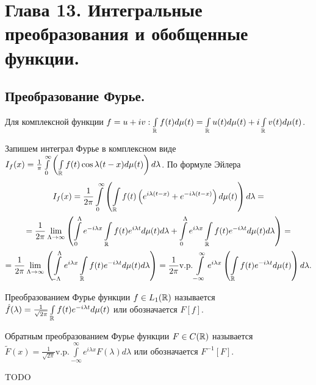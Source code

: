 \section{Глава 13. Интегральные преобразования и обобщенные функции.}
\subsection{Преобразование Фурье.}
Для комплексной функции $f=u+iv: \int\limits_{\mathbb{R}} f(t)d\mu(t)=\int\limits_{\mathbb{R}} u(t)d\mu(t)+i\int\limits_{\mathbb{R}} v(t)d\mu(t)$.

Запишем интеграл Фурье в комплексном виде $I_f(x)=\frac{1}{\pi}\int\limits_0^\infty\left(\int\limits_{\mathbb{R}}f(t)\cos\lambda(t-x)d\mu(t)\right)d\lambda$. По формуле Эйлера
\begin{multline*}
	I_f(x)=\frac{1}{2\pi}\int\limits_0^\infty\left(\int\limits_{\mathbb{R}}f(t)\left(e^{i\lambda(t-x)}+e^{-i\lambda(t-x)}\right)d\mu(t)\right)d\lambda=\\
	=\frac{1}{2\pi}\lim\limits_{\Lambda\to\infty}\left(\int\limits_0^\Lambda e^{-i\lambda x}\int\limits_{\mathbb{R}} f(t)e^{i\lambda t}d\mu(t)d\lambda+\int\limits_0^\Lambda e^{i\lambda x}\int\limits_{\mathbb{R}} f(t)e^{-i\lambda t}d\mu(t)d\lambda\right)=\\
	=\frac{1}{2\pi}\lim\limits_{\Lambda\to\infty}\left(\int\limits_{-\Lambda}^\Lambda e^{i\lambda x}\int\limits_{\mathbb{R}} f(t)e^{-i\lambda t}d\mu(t)d\lambda\right)=\frac{1}{2\pi}\text{v.p.}\int\limits_{-\infty}^\infty e^{i\lambda x}\left(\int\limits_{\mathbb{R}} f(t)e^{-i\lambda t}d\mu(t)\right)d\lambda.
\end{multline*} 
\begin{Def}
	Преобразованием Фурье функции $f\in L_1(\mathbb{R})$ называется $\hat{f}(\lambda)=\frac{1}{\sqrt{2\pi}}\int\limits_{\mathbb{R}} f(t)e^{-i\lambda t}d\mu(t)$ или обозначается $F[f]$.
\end{Def}

\begin{Def}
	Обратным преобразованием Фурье функции $F\in C(\mathbb{R})$ называется $\widetilde{F}(x)=\frac{1}{\sqrt{2\pi}}\text{v.p.}\int\limits_{-\infty}^\infty e^{i\lambda x}F(\lambda)d\lambda$ или обозначается $F^{-1}[F]$.
\end{Def}

TODO
